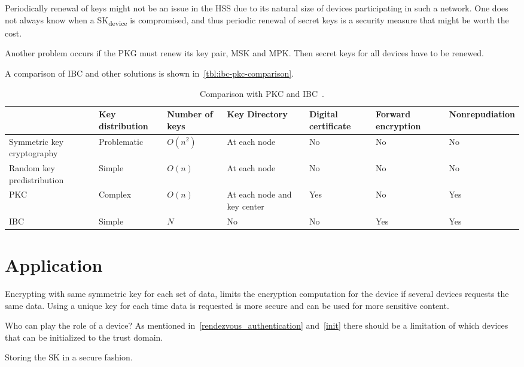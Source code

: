 Periodically renewal of keys might not be an issue in the \gls{HSS} due to its natural size of devices participating in such a network.
One does not always know when a SK\textsubscript{device} is compromised, and thus periodic renewal of secret keys is a security measure that might be worth the cost.

Another problem occurs if the \gls{PKG} must renew its key pair, \gls{MSK} and \gls{MPK}.
Then secret keys for all devices have to be renewed.

A comparison of \gls{IBC} and other solutions is shown in~\autoref{tbl:ibc-pkc-comparison}.
\begin{table}[h]\footnotesize
  \begin{tabular}[c]{ | p{2cm} | p{1.5cm} | p{1cm} | p{1.2cm} | p{1cm} | p{1.3cm} | p{1.8cm} |}
  \hline 
  & Key distribution 	& Number of keys & Key Directory & Digital certificate & Forward encryption & Nonrepudiation \\ \hline
  Symmetric key cryptography & Problematic & $O(n^2)$ & At each node & No & No & No \\ \hline 
  Random key predistribution & Simple & $O(n)$ & At each node & No & No & No \\ \hline
  PKC & Complex & $O(n)$ & At each node and key center & Yes & No & Yes \\ \hline
  IBC & Simple & $N$ & No & No & Yes & Yes \\ \hline
  \end{tabular}
  \caption{Comparison with PKC and IBC~\cite[Table 9.6]{Patil:2012:SWS:2464778}.}
  \label{tbl:ibc-pkc-comparison}
\end{table}

\section{Application}

Encrypting with same symmetric key for each set of \gls{data}, limits the encryption computation for the device if several devices requests the same \gls{data}.
Using a unique key for each time \gls{data} is requested is more secure and can be used for more sensitive content.

Who can play the role of a device?
As mentioned in~\autoref{rendezvous_authentication} and~\autoref{init} there should be a limitation of which devices that can be initialized to the trust domain.

Storing the \gls{SK} in a secure fashion.

